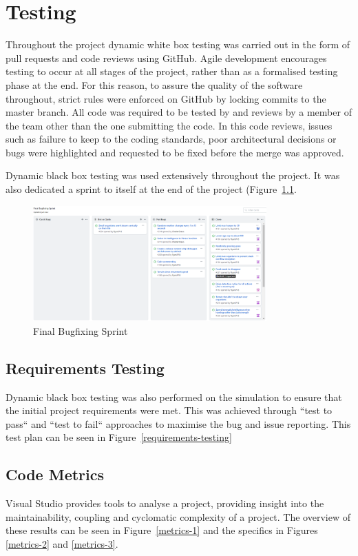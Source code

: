 \documentclass[a4paper, oneside, 11pt]{report}
\begin{document}
\chapter{Testing}\label{testing}
Throughout the project dynamic white box testing was carried out in the form of pull requests and code reviews using GitHub. Agile development encourages testing to occur at all stages of the project, rather than as a formalised testing phase at the end. For this reason, to assure the quality of the software throughout, strict rules were enforced on GitHub by locking commits to the master branch. All code was required to be tested by and reviews by a member of the team other than the one submitting the code. In this code reviews, issues such as failure to keep to the coding standards, poor architectural decisions or bugs were highlighted and requested to be fixed before the merge was approved.

Dynamic black box testing was used extensively throughout the project. It was also dedicated a sprint to itself at the end of the project (Figure~\ref{gitbugfixing}.

\begin{figure}[H]
	\caption{Final Bugfixing Sprint}\label{gitbugfixing}
	\centering
	\includegraphics[width=0.8\textwidth]{gitbugfixing}
\end{figure}

\section{Requirements Testing}
Dynamic black box testing was also performed on the simulation to ensure that the initial project requirements were met. This was achieved through ``test to pass`` and ``test to fail`` approaches to maximise the bug and issue reporting. This test plan can be seen in Figure~\ref{requirements-testing}

\section{Code Metrics}
Visual Studio provides tools to analyse a project, providing insight into the maintainability, coupling and cyclomatic complexity of a project. The overview of these results can be seen in Figure~\ref{metrics-1} and the specifics in Figures \ref{metrics-2} and \ref{metrics-3}.
\end{document}
